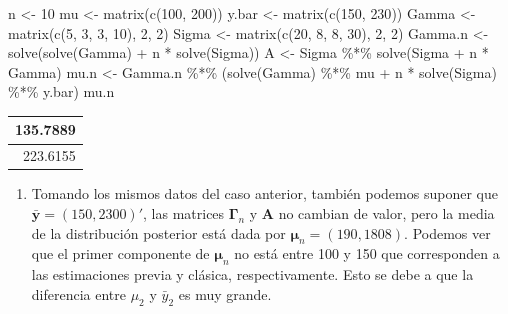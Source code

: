 \documentclass[
  10pt,
  spanish,
]{book}
\newenvironment{Shaded}{\begin{snugshade}}{\end{snugshade}}
\newcommand{\DecValTok}[1]{\textcolor[rgb]{0.00,0.00,0.81}{#1}}
\newcommand{\FunctionTok}[1]{\textcolor[rgb]{0.00,0.00,0.00}{#1}}
\newcommand{\NormalTok}[1]{#1}
\newcommand{\OtherTok}[1]{\textcolor[rgb]{0.56,0.35,0.01}{#1}}
\newcommand{\SpecialCharTok}[1]{\textcolor[rgb]{0.00,0.00,0.00}{#1}}
\providecommand{\tightlist}{%
  \setlength{\itemsep}{0pt}\setlength{\parskip}{0pt}}
\theoremstyle{definition}
\theoremstyle{definition}
\theoremstyle{definition}
\theoremstyle{definition}
\theoremstyle{remark}
\begin{document}
\begin{Shaded}
\begin{Highlighting}[]
\NormalTok{n }\OtherTok{\textless{}{-}} \DecValTok{10}
\NormalTok{mu }\OtherTok{\textless{}{-}} \FunctionTok{matrix}\NormalTok{(}\FunctionTok{c}\NormalTok{(}\DecValTok{100}\NormalTok{, }\DecValTok{200}\NormalTok{))}
\NormalTok{y.bar }\OtherTok{\textless{}{-}} \FunctionTok{matrix}\NormalTok{(}\FunctionTok{c}\NormalTok{(}\DecValTok{150}\NormalTok{, }\DecValTok{230}\NormalTok{))}
\NormalTok{Gamma }\OtherTok{\textless{}{-}} \FunctionTok{matrix}\NormalTok{(}\FunctionTok{c}\NormalTok{(}\DecValTok{5}\NormalTok{, }\DecValTok{3}\NormalTok{, }\DecValTok{3}\NormalTok{, }\DecValTok{10}\NormalTok{), }\DecValTok{2}\NormalTok{, }\DecValTok{2}\NormalTok{)}
\NormalTok{Sigma }\OtherTok{\textless{}{-}} \FunctionTok{matrix}\NormalTok{(}\FunctionTok{c}\NormalTok{(}\DecValTok{20}\NormalTok{, }\DecValTok{8}\NormalTok{, }\DecValTok{8}\NormalTok{, }\DecValTok{30}\NormalTok{), }\DecValTok{2}\NormalTok{, }\DecValTok{2}\NormalTok{)}
\NormalTok{Gamma.n }\OtherTok{\textless{}{-}} \FunctionTok{solve}\NormalTok{(}\FunctionTok{solve}\NormalTok{(Gamma) }\SpecialCharTok{+}\NormalTok{ n }\SpecialCharTok{*} \FunctionTok{solve}\NormalTok{(Sigma))}
\NormalTok{A }\OtherTok{\textless{}{-}}\NormalTok{ Sigma }\SpecialCharTok{\%*\%} \FunctionTok{solve}\NormalTok{(Sigma }\SpecialCharTok{+}\NormalTok{ n }\SpecialCharTok{*}\NormalTok{ Gamma) }
\NormalTok{mu.n }\OtherTok{\textless{}{-}}\NormalTok{ Gamma.n }\SpecialCharTok{\%*\%} 
\NormalTok{  (}\FunctionTok{solve}\NormalTok{(Gamma) }\SpecialCharTok{\%*\%}\NormalTok{ mu }\SpecialCharTok{+}\NormalTok{ n }\SpecialCharTok{*} \FunctionTok{solve}\NormalTok{(Sigma) }\SpecialCharTok{\%*\%}\NormalTok{ y.bar)}
\NormalTok{mu.n}
\end{Highlighting}
\end{Shaded}

\begin{tabular}{r}
\hline
135.7889\\
\hline
223.6155\\
\hline
\end{tabular}

\begin{enumerate}
\def\labelenumi{\arabic{enumi}.}
\setcounter{enumi}{1}
\tightlist
\item
  Tomando los mismos datos del caso anterior, también podemos suponer que \(\bar{\mathbf{y}}=(150, 2300)'\), las matrices \(\boldsymbol \Gamma_n\) y \(\mathbf{A}\) no cambian de valor, pero la media de la distribución posterior está dada por \(\boldsymbol \mu_n=(190,1808)\). Podemos ver que el primer componente de \(\boldsymbol \mu_n\) no está entre 100 y 150 que corresponden a las estimaciones previa y clásica, respectivamente. Esto se debe a que la diferencia entre \(\mu_2\) y \(\bar{y}_2\) es muy grande.
\end{enumerate}
\end{document}
